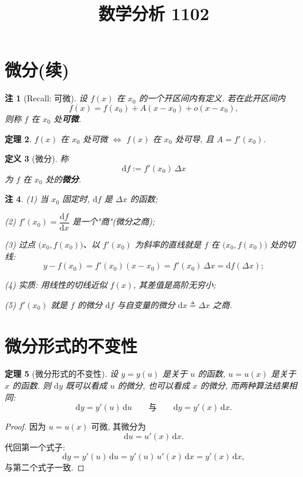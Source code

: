 \documentclass[UTF8,11pt]{ctexart}
\title{数学分析 1102}
\date{}
\theoremstyle{cnthm}
\newtheorem{thm}{定理}[section]
\newtheorem{defn}[thm]{定义}
\newtheorem{rem}[thm]{注}
\begin{document}
\maketitle

\section{微分(续)}

\begin{rem}[Recall: 可微]
设 $f(x)$ 在 $x_0$ 的一个开区间内有定义. 若在此开区间内
\[
f(x)=f(x_0)+A(x-x_0)+o(x-x_0),
\]
则称 $f$ 在 $x_0$ 处\textbf{可微}.
\end{rem}

\begin{thm}
$f(x)$ 在 $x_0$ 处可微 $\iff$ $f(x)$ 在 $x_0$ 处可导, 且 $A=f'(x_0)$.
\end{thm}

\begin{defn}[微分]
称
\[
\mathrm{d}f:=f'(x_0)\,\Delta x
\]
为 $f$ 在 $x_0$ 处的\textbf{微分}.
\end{defn}

\begin{rem}
(1) 当 $x_0$ 固定时, $\mathrm{d}f$ 是 $\Delta x$ 的函数;

(2) $f'(x_0)=\dfrac{\mathrm{d}f}{\mathrm{d}x}$ 是一个"商"(微分之商);

(3) 过点 $\bigl(x_0,f(x_0)\bigr)$、以 $f'(x_0)$ 为斜率的直线就是 $f$ 在 $\bigl(x_0,f(x_0)\bigr)$ 处的切线:
\[
y-f(x_0)=f'(x_0)(x-x_0)=f'(x_0)\,\Delta x=\mathrm{d}f(\Delta x);
\]

(4) 实质: 用线性的切线近似 $f(x)$, 其差值是高阶无穷小;

(5) $f'(x_0)$ 就是 $f$ 的微分 $\mathrm{d}f$ 与自变量的微分 $\mathrm{d}x\triangleq\Delta x$ 之商.
\end{rem}

\section{微分形式的不变性}

\begin{thm}[微分形式的不变性]
设 $y=y(u)$ 是关于 $u$ 的函数, $u=u(x)$ 是关于 $x$ 的函数. 则 $\mathrm{d}y$ 既可以看成 $u$ 的微分, 也可以看成 $x$ 的微分, 而两种算法结果相同:
\[
\mathrm{d}y=y'(u)\,\mathrm{d}u
\qquad\text{与}\qquad
\mathrm{d}y=y'(x)\,\mathrm{d}x .
\]
\end{thm}

\begin{proof}
因为 $u=u(x)$ 可微, 其微分为
\[
\mathrm{d}u=u'(x)\,\mathrm{d}x .
\]
代回第一个式子:
\[
\mathrm{d}y=y'(u)\,\mathrm{d}u=y'(u)\,u'(x)\,\mathrm{d}x=y'(x)\,\mathrm{d}x ,
\]
与第二个式子一致.
\end{proof}
\end{document}
